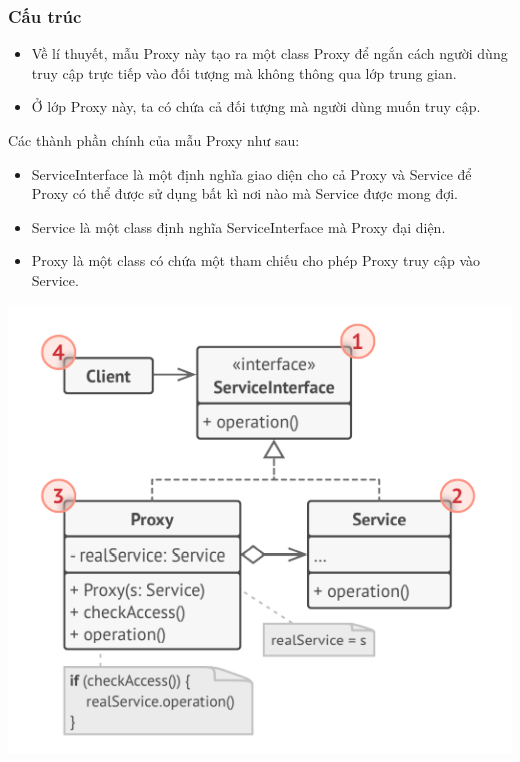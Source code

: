 \subsubsection{Cấu trúc}
\begin{itemize}
    \item Về lí thuyết, mẫu Proxy này tạo ra một class Proxy để ngắn cách người dùng truy cập trực tiếp vào đối tượng mà không thông qua lớp trung gian.
    \item Ở lớp Proxy này, ta có chứa cả đối tượng mà người dùng muốn truy cập.
\end{itemize}
Các thành phần chính của mẫu Proxy như sau:
\begin{itemize}
    \item ServiceInterface là một định nghĩa giao diện cho cả Proxy và Service để Proxy có thể được sử dụng bất kì nơi nào mà Service được mong đợi.
    \item Service là một class định nghĩa ServiceInterface mà Proxy đại diện.
    \item Proxy là một class có chứa một tham chiếu cho phép Proxy truy cập vào Service. 
\end{itemize}
\begin{center}
    \includegraphics[scale=0.6]{image/structural/proxy.png}
\end{center}
